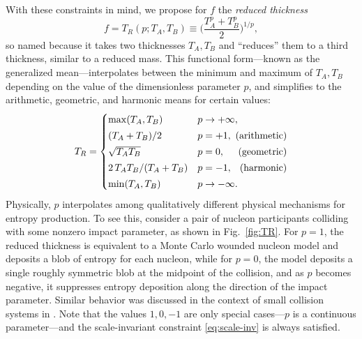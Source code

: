 \documentclass[aps,prc,reprint,amsmath,noeprint]{revtex4-1}
\begin{document}
With these constraints in mind, we propose for $f$ the \emph{reduced thickness}
\begin{equation}
  f = T_R(p; T_A, T_B) \equiv \biggl( \frac{T_A^p + T_B^p}{2} \biggr)^{1/p},
  \label{eq:tr}
\end{equation}
so named because it takes two thicknesses $T_A, T_B$ and ``reduces'' them to a third thickness, similar to a
reduced mass.
This functional form---known as the generalized mean---interpolates between the minimum and maximum of $T_A, T_B$ depending on the value of the dimensionless parameter $p$, and simplifies to the arithmetic, geometric, and harmonic means for certain values:
\begin{equation}
  \newlength{\extraspace}
  \setlength{\extraspace}{0.5ex}
  T_R =
  \begin{cases}
    \max(T_A, T_B) & p \rightarrow +\infty, \\[\extraspace]
    (T_A + T_B)/2 & p = +1, \hfill \text{ (arithmetic)} \\[\extraspace]
    \sqrt{T_A T_B} & p = 0, \hfill \text{ (geometric)} \\[\extraspace]
    2\, T_A T_B/(T_A + T_B) & p = -1, \hfill \text{ (harmonic)} \\[\extraspace]
    \min(T_A, T_B) & p \rightarrow -\infty.
  \end{cases}
\end{equation}
Physically, $p$ interpolates among qualitatively different physical mechanisms for entropy production.
To see this, consider a pair of nucleon participants colliding with some nonzero impact parameter, as shown in Fig.~\ref{fig:TR}.
For $p = 1$, the reduced thickness is equivalent to a Monte Carlo wounded nucleon model and deposits a blob of entropy for each nucleon,
while for $p = 0$, the model deposits a single roughly symmetric blob at the midpoint of the collision,
and as $p$ becomes negative, it suppresses entropy deposition along the direction of the impact parameter.
Similar behavior was discussed in the context of small collision systems in \cite{Bzdak:2013zma}.
Note that the values $1, 0, -1$ are only special cases---$p$ is a continuous parameter---and the scale-invariant constraint \eqref{eq:scale-inv} is always satisfied.
\end{document}
